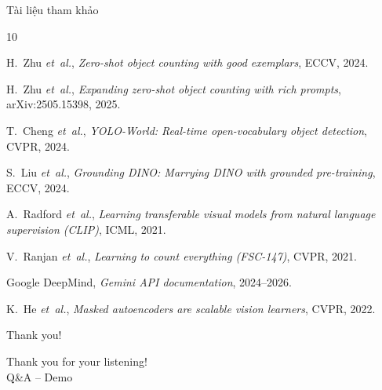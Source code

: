 \documentclass[11pt]{beamer}
\begin{document}
\begin{frame}{Tài liệu tham khảo}
\scriptsize
\begin{thebibliography}{10}

H.~Zhu \emph{et~al.},
\textit{Zero-shot object counting with good exemplars},
ECCV, 2024.

H.~Zhu \emph{et~al.},
\textit{Expanding zero-shot object counting with rich prompts},
arXiv:2505.15398, 2025.

T.~Cheng \emph{et~al.},
\textit{YOLO-World: Real-time open-vocabulary object detection},
CVPR, 2024.

S.~Liu \emph{et~al.},
\textit{Grounding DINO: Marrying DINO with grounded pre-training},
ECCV, 2024.

A.~Radford \emph{et~al.},
\textit{Learning transferable visual models from natural language supervision (CLIP)},
ICML, 2021.

V.~Ranjan \emph{et~al.},
\textit{Learning to count everything (FSC-147)},
CVPR, 2021.

Google DeepMind,
\textit{Gemini API documentation}, 2024--2026.

K.~He \emph{et~al.},
\textit{Masked autoencoders are scalable vision learners},
CVPR, 2022.

\end{thebibliography}
\end{frame}

\begin{frame}{Thank you!}
  \begin{center}
    \Large Thank you for your listening! \\
    \vspace{0.5cm}
    \normalsize Q\&A -- Demo
  \end{center}
\end{frame}
\end{document}
